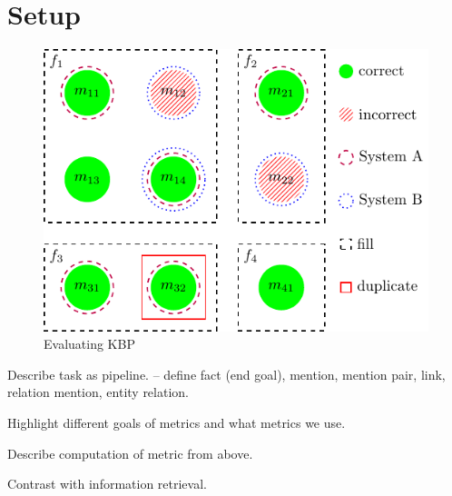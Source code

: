 \section{Setup}
\label{sec:setup}

\begin{figure}
  \includegraphics[width=\columnwidth]{figures/evaluation-overview}
  \caption{Evaluating KBP}
\end{figure}

Describe task as pipeline. -- define fact (end goal), mention, mention pair, link, relation mention, entity relation.

Highlight different goals of metrics and what metrics we use.

Describe computation of metric from above.

Contrast with information retrieval.
